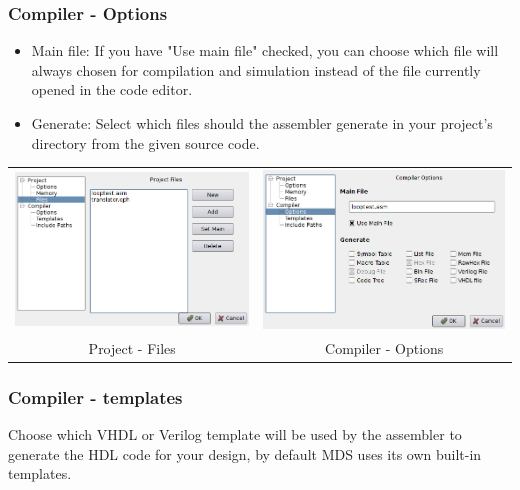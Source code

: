         \subsubsection{Compiler - Options}
            \begin{itemize}
                \item
                    Main file: If you have "Use main file" checked, you can choose which file will always chosen for compilation and simulation instead of the file currently opened in the code editor.
                \item
                    Generate: Select which files should the assembler generate in your project's directory from the given source code.
            \end{itemize}

            \begin{table}[h!]
                \begin{tabular}{cc}
                    \includegraphics[width=.5\textwidth]{img/config3.png}
                        &
                    \includegraphics[width=.5\textwidth]{img/config4.png}
                        \\
                    Project - Files & Compiler - Options
                \end{tabular}
            \end{table}

        \subsubsection{Compiler - templates}
            Choose which VHDL or Verilog template will be used by the assembler to generate the HDL code for your
            design, by default MDS uses its own built-in templates.

